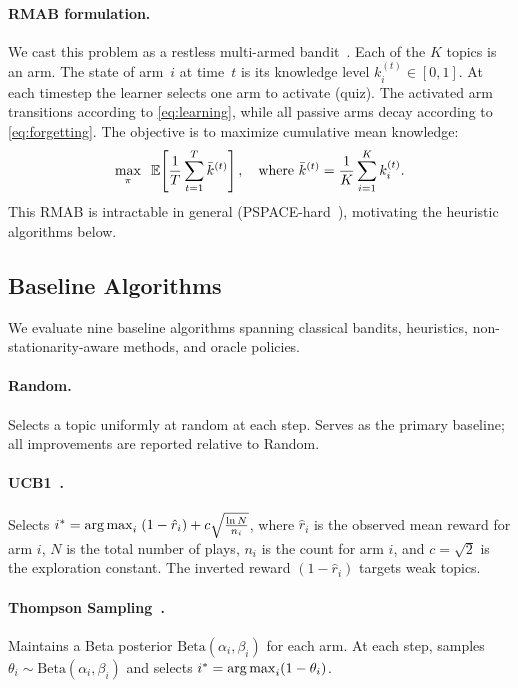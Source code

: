 \paragraph{RMAB formulation.}
We cast this problem as a restless multi-armed bandit~\citep{whittle1988restless}.
Each of the $K$ topics is an arm.
The state of arm~$i$ at time~$t$ is its knowledge level $k_i^{(t)} \in [0,1]$.
At each timestep the learner selects one arm to activate (quiz).
The activated arm transitions according to \eqref{eq:learning}, while all passive arms decay according to \eqref{eq:forgetting}.
The objective is to maximize cumulative mean knowledge:
\begin{equation}
    \max_{\pi} \;\; \mathbb{E}\!\left[\frac{1}{T} \sum_{t=1}^{T} \bar{k}^{(t)}\right], \quad \text{where } \bar{k}^{(t)} = \frac{1}{K}\sum_{i=1}^{K} k_i^{(t)}.
    \label{eq:objective}
\end{equation}
This RMAB is intractable in general (PSPACE-hard~\citep{papadimitriou1999complexity}), motivating the heuristic algorithms below.

\subsection{Baseline Algorithms}
\label{sec:baselines}

We evaluate nine baseline algorithms spanning classical bandits, heuristics, non-stationarity-aware methods, and oracle policies.

\paragraph{Random.}
Selects a topic uniformly at random at each step.
Serves as the primary baseline; all improvements are reported relative to Random.

\paragraph{UCB1~\citep{auer2002finite}.}
Selects $i^* = \operatorname*{arg\,max}_i \; (1 - \hat{r}_i) + c\sqrt{\frac{\ln N}{n_i}}$, where $\hat{r}_i$ is the observed mean reward for arm $i$, $N$ is the total number of plays, $n_i$ is the count for arm $i$, and $c = \sqrt{2}$ is the exploration constant.
The inverted reward $(1 - \hat{r}_i)$ targets weak topics.

\paragraph{Thompson Sampling~\citep{thompson1933likelihood}.}
Maintains a Beta posterior $\text{Beta}(\alpha_i, \beta_i)$ for each arm.
At each step, samples $\theta_i \sim \text{Beta}(\alpha_i, \beta_i)$ and selects $i^* = \operatorname*{arg\,max}_i (1 - \theta_i)$.

